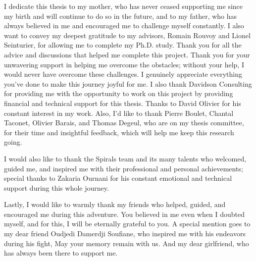 
\begin{acknowledgements}

    I dedicate this thesis to my mother, who has never ceased supporting me since my birth and will continue to do so in the future, and to my father, who has always believed in me and encouraged me to challenge myself constantly.
    I also want to convey my deepest gratitude to my advisors, Romain Rouvoy and Lionel Seinturier, for allowing me to complete my Ph.D. study. Thank you for all the advice and discussions that helped me complete this project. Thank you for your unwavering support in helping me overcome the obstacles; without your help, I would never have overcome these challenges. I genuinely appreciate everything you've done to make this journey joyful for me.
    I also thank Davidson Consulting for providing me with the opportunity to work on this project by providing financial and technical support for this thesis. Thanks to David Olivier for his constant interest in my work.
    Also, I'd like to thank Pierre Boulet, Chantal Taconet, Olivier Barais, and Thomas Degeul, who are on my thesis committee, for their time and insightful feedback, which will help me keep this research going.

    I would also like to thank the Spirals team and its many talents who welcomed, guided me, and inspired me with their professional and personal achievements; special thanks to Zakaria Ournani for his constant emotional and technical support during this whole journey.

    Lastly, I would like to warmly thank my friends who helped, guided, and encouraged me during this adventure. You believed in me even when I doubted myself, and for this, I will be eternally grateful to you. A special mention goes to my dear friend Oudjedi Damerdji Soufiane, who inspired me with his endeavors during his fight, May your memory remain with us. And my dear girlfriend, who has always been there to support me.




\end{acknowledgements}
